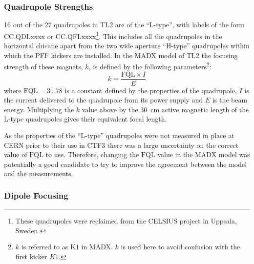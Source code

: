 \subsubsection{Quadrupole Strengths}
\label{sss:quadStrengths}

16 out of the 27 quadrupoles in TL2 are of the ``L-type'', with labels of the form CC.QDLxxxx or CC.QFLxxxx\footnote{These quadrupoles were reclaimed from the CELSIUS project in Uppsala, Sweden \cite{celsius}}. This includes all the quadrupoles in the horizontal chicane apart from the two wide aperture ``H-type'' quadrupoles within which the PFF kickers are installed. In the MADX model of TL2 the focusing strength of these magnets, \(k\), is defined by the following parameters\footnote{\(k\) is referred to as \(\mathrm{K1}\) in MADX. \(k\) is used here to avoid confusion with the first kicker \(K1\).}:
\begin{equation}
k = \frac{\mathrm{FQL}\times I}{E}
\end{equation}
where \(\mathrm{FQL} = 31.78\) is a constant defined by the properties of the quadrupole, \(I\) is the current delivered to the quadrupole from its power supply and \(E\) is the beam energy. 
Multiplying the \(k\) value above by the 30~cm active magnetic length of the L-type quadrupoles gives their equivalent focal length.

As the properties of the ``L-type'' quadrupoles were not measured in place at CERN prior to their use in CTF3 there was a large uncertainty on the correct value of \(\mathrm{FQL}\) to use. Therefore, changing the \(\mathrm{FQL}\) value in the MADX model was potentially a good candidate to try to improve the agreement between the model and the measurements.

\subsubsection{Dipole Focusing}
\label{sss:edgeFocusing}

